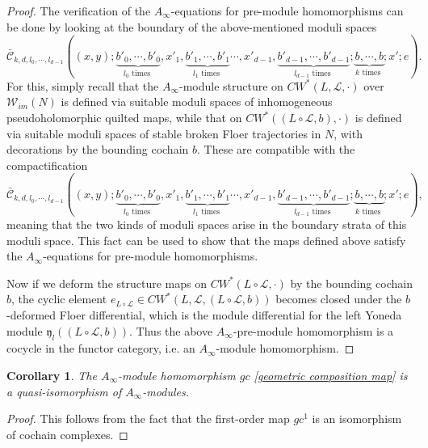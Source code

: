 \documentclass{amsart}
\newtheorem{corollary}[theorem]{Corollary}
\numberwithin{equation}{section}
\numberwithin{figure}{section}
\begin{document}
\begin{proof}
	The verification of the $A_{\infty}$-equations for pre-module homomorphisms can be done by looking at the boundary of the above-mentioned moduli spaces
\begin{equation*}
\bar{\mathcal{C}}_{k, d, l_{0}, \cdots, l_{d-1}}((x, y); \underbrace{b'_{0}, \cdots, b'_{0}}_{l_{0} \text{ times }}, x'_{1}, \underbrace{b'_{1}, \cdots, b'_{1}}_{l_{1} \text{ times }} \cdots, x'_{d-1}, \underbrace{b'_{d-1}, \cdots, b'_{d-1}}_{l_{d-1} \text{ times }}; \underbrace{b, \cdots, b}_{k \text{ times }}; x'; e).
\end{equation*}
For this, simply recall that the $A_{\infty}$-module structure on $CW^{*}(L, \mathcal{L}, \cdot)$ over $\mathcal{W}_{im}(N)$ is defined via suitable moduli spaces of inhomogeneous pseudoholomorphic quilted maps, while that on $CW^{*}((L \circ \mathcal{L}, b), \cdot)$ is defined via suitable moduli spaces of stable broken Floer trajectories in $N$, with decorations by the bounding cochain $b$. These are compatible with the compactification 
\begin{equation*}
\bar{\mathcal{C}}_{k, d, l_{0}, \cdots, l_{d-1}}((x, y); \underbrace{b'_{0}, \cdots, b'_{0}}_{l_{0} \text{ times }}, x'_{1}, \underbrace{b'_{1}, \cdots, b'_{1}}_{l_{1} \text{ times }} \cdots, x'_{d-1}, \underbrace{b'_{d-1}, \cdots, b'_{d-1}}_{l_{d-1} \text{ times }}; \underbrace{b, \cdots, b}_{k \text{ times }}; x'; e),
\end{equation*}
meaning that the two kinds of moduli spaces arise in the boundary strata of this moduli space. This fact can be used to show that the maps defined above satisfy the $A_{\infty}$-equations for pre-module homomorphisms. \par
	Now if we deform the structure maps on $CW^{*}(L \circ \mathcal{L}, \cdot)$ by the bounding cochain $b$, the cyclic element $e_{L \circ \mathcal{L}} \in CW^{*}(L, \mathcal{L}, (L \circ \mathcal{L}, b))$ becomes closed under the $b$-deformed Floer differential, which is the module differential for the left Yoneda module $\mathfrak{y}_{l}((L \circ \mathcal{L}, b))$. Thus the above $A_{\infty}$-pre-module homomorphism is a cocycle in the functor category, i.e. an $A_{\infty}$-module homomorphism. \par
\end{proof}

\begin{corollary}
	The $A_{\infty}$-module homomorphism $gc$ \eqref{geometric composition map} is a quasi-isomorphism of $A_{\infty}$-modules.
\end{corollary}
\begin{proof}
	This follows from the fact that the first-order map $gc^{1}$ is an isomorphism of cochain complexes. \par
\end{proof}
\end{document}
